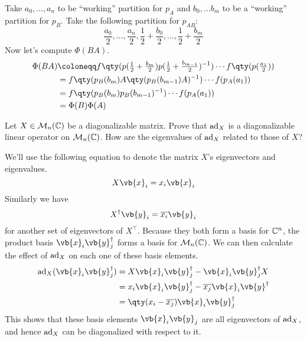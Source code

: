 \documentclass[
	pages,
	boxes,
	color=WildStrawberry
]{homework}
\begin{document}
\begin{solution}
	Take $a_0, \ldots, a_n$ to be ``working'' partition for $p_A$ and $b_0, \ldots b_m$ to be a ``working'' partition for $p_B$. Take the following partition for $p_{AB}$:
	\begin{equation*}
		\frac{a_0}{2}, \ldots, \frac{a_n}{2}, \frac{1}{2} + \frac{b_0}{2}, \ldots, \frac{1}{2} + \frac{b_m}{2}
	\end{equation*}
	Now let's compute $\Phi(BA)$.
	\begin{align*}
		\Phi(BA) & \defeq f\qty(p(\tfrac{1}{2} + \tfrac{b_m}{2})p(\tfrac{1}{2} + \tfrac{b_{m-1}}{2})^{-1})\cdots f\qty(p(\tfrac{a_1}{2})) \\
		         & = f\qty(p_B(b_m)A\qty(p_B(b_{m-1})A)^{-1})\cdots f(p_A(a_1))                                                           \\
		         & = f\qty(p_B(b_m)p_B(b_{m-1})^{-1})\cdots f(p_A(a_1))                                                                   \\
		         & = \Phi(B)\Phi(A)
	\end{align*}
\end{solution}

\begin{problem}
Let $X \in \mathcal{M}_{n}(\mathbb{C})$ be a diagonalizable matrix. Prove that $\operatorname{ad}_X$ is a diagonalizable linear operator on $\mathcal{M}_{n}(\mathbb{C})$. How are the eigenvalues of $\operatorname{ad}_X$ related to those of $X$?
\end{problem}

\begin{solution}
	We'll use the following equation to denote the matrix $X$'s eigenvectors and eigenvalues.
	\begin{equation*}
		X\vb{x}_i = x_i\vb{x}_i
	\end{equation*}
	Similarly we have
	\begin{equation*}
		X^\dagger\vb{y}_i = \overline{x_i}\vb{y}_i
	\end{equation*}
	for another set of eigenvectors of $X^\intercal$. Because they both form a basis for $\mathbb{C}^n$, the product basis $\vb{x}_i\vb{y}_j^\dagger$ forms a basis for $\mathcal{M}_{n}(\mathbb{C})$. We can then calculate the effect of $\operatorname{ad}_X$ on each one of these basis elements.
	\begin{align*}
		\ad_X(\vb{x}_i \vb{y}_j^\dagger) & = X\vb{x}_i\vb{y}_j^\dagger - \vb{x}_i \vb{y}_j^\dagger X            \\
		                                 & = x_i\vb{x}_i\vb{y}_j^\dagger - \overline{x_j}\vb{x}_i\vb{y}^\dagger \\
		                                 & = \qty(x_i - \overline{x_j})\vb{x}_i\vb{y}_j^\dagger
	\end{align*}
	This shows that these basis elements $\vb{x}_i\vb{y}_j$ are all eigenvectors of $\operatorname{ad}_X$, and hence $\operatorname{ad}_X$ can be diagonalized with respect to it.
\end{solution}
\end{document}
